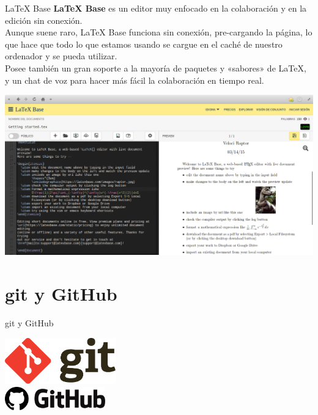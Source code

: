 \documentclass[12pt,aspectratio=43]{beamer}
\newcommand{\lmr}{\fontfamily{lmr}\selectfont}
\begin{document}
\begin{frame}{LaTeX Base}{}
\alert{\bf LaTeX Base} es un editor muy enfocado en la colaboración y en la edición sin conexión.\pause\\[1em]

Aunque suene raro, LaTeX Base funciona sin conexión, pre-cargando la página, lo que hace que todo lo que estamos usando se cargue en el caché de nuestro ordenador y se pueda utilizar.\pause\\[1em]

Posee también un gran soporte a la mayoría de paquetes y «sabores» de {\lmr\LaTeX}, y un chat de voz para hacer más fácil la colaboración en tiempo real.
\end{frame}

\begin{frame}[plain]{}{}
\includegraphics[width=\linewidth]{LaTeXBase_Screen}
\end{frame}

\section{git y GitHub}
\begin{frame}{git y GitHub}{}
\begin{center}
	\includegraphics[height=2cm]{git_Logo}\\[2em]
	\includegraphics[height=1cm]{GitHub_Logo}
\end{center}
\end{frame}
\end{document}
